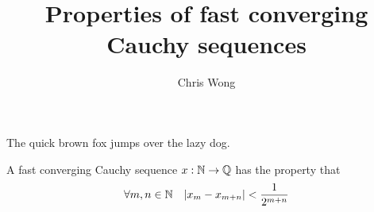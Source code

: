 \documentclass[leqno]{article}
\begin{document}
\author{Chris Wong}
\title{Properties of fast converging Cauchy sequences}
\maketitle

The quick brown fox jumps over the lazy dog.

\begin{Definition}
    A fast converging Cauchy sequence $x : \mathbb{N} \rightarrow \mathbb{Q}$ has the property that
    \[ \forall {m, n \in \mathbb{N}} \quad { \left| x_m - x_{m+n} \right| < \frac{1}{2^{m+n}} } \]
\end{Definition}



\end{document}
